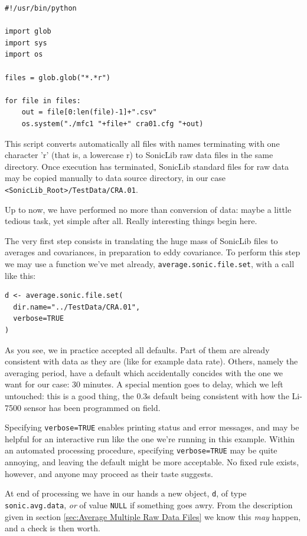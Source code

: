 \documentclass[a4paper,10pt]{book}
\begin{document}
\begin{verbatim}
#!/usr/bin/python

import glob
import sys
import os

files = glob.glob("*.*r")

for file in files:
	out = file[0:len(file)-1]+".csv"
	os.system("./mfc1 "+file+" cra01.cfg "+out)
\end{verbatim} 

This script converts automatically all files with names terminating with one character 'r' (that is, a lowercase r) to SonicLib raw data files in the same directory. Once execution has terminated, SonicLib standard files for raw data may be copied manually to data source directory, in our case \verb|<SonicLib_Root>/TestData/CRA.01|.

Up to now, we have performed no more than conversion of data: maybe a little tedious task, yet simple after all. Really interesting things begin here.

The very first step consists in translating the huge mass of SonicLib files to averages and covariances, in preparation to eddy covariance. To perform this step we may use a function we've met already, \verb|average.sonic.file.set|, with a call like this:

\begin{verbatim}
d <- average.sonic.file.set(
  dir.name="../TestData/CRA.01",
  verbose=TRUE
)
\end{verbatim} 

As you see, we in practice accepted all defaults. Part of them are already consistent with data as they are (like for example data rate). Others, namely the averaging period, have a default which accidentally concides with the one we want for our case: 30 minutes. A special mention goes to delay, which we left untouched: this is a good thing, the 0.3s default being consistent with how the Li-7500 sensor has been programmed on field.

Specifying \verb|verbose=TRUE| enables printing status and error messages, and may be helpful for an interactive run like the one we're running in this example. Within an automated processing procedure, specifying \verb|verbose=TRUE| may be quite annoying, and leaving the default might be more acceptable. No fixed rule exists, however, and anyone may proceed as their taste suggests.

At end of processing we have in our hands a new object, \verb|d|, of type \verb|sonic.avg.data|, \emph{or} of value \verb|NULL| if something goes awry. From the description given in section \ref{sec:Average Multiple Raw Data Files} we know this \emph{may} happen, and a check is then worth.
\end{document}
